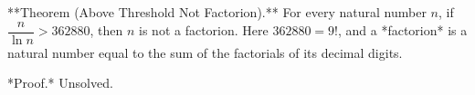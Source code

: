 
**Theorem (Above Threshold Not Factorion).** For every natural number $n$, if $\dfrac{n}{\ln n} > 362880$, then $n$ is not a factorion. Here $362880 = 9!$, and a *factorion* is a natural number equal to the sum of the factorials of its decimal digits.

*Proof.* Unsolved.